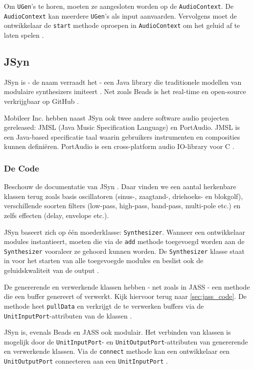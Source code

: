 Om \verb+UGen+'s te horen, moeten ze aangesloten worden op de \verb+AudioContext+. De \verb+AudioContext+ kan meerdere \verb+UGen+'s als input aanvaarden. Vervolgens moet de ontwikkelaar de \verb+start+ methode oproepen in \verb+AudioContext+ om het geluid af te laten spelen \autocite{beadsdocs}.

\subsection{JSyn}

JSyn is - de naam verraadt het - een Java library die traditionele modellen van modulaire synthesizers imiteert \autocite{jsyn}. Net zoals Beads is het real-time en open-source verkrijgbaar op GitHub \autocite{jsyngit}.

Mobileer Inc. hebben naast JSyn ook twee andere software audio projecten gereleased: JMSL (Java Music Specification Language) en PortAudio. JMSL is een Java-based specificatie taal waarin gebruikers instrumenten en composities kunnen definiëren. PortAudio is een cross-platform audio IO-library voor C \autocite{jsyn}.

\subsubsection*{De Code}

Beschouw de documentatie van JSyn \autocite{jsyndocs}. Daar vinden we een aantal herkenbare klassen terug zoals basis oscillatoren (sinus-, zaagtand-, driehoeks- en blokgolf), verschillende soorten filters (low-pass, high-pass, band-pass, multi-pole etc.) en zelfs effecten (delay, envelope etc.).

JSyn baseert zich op één moederklasse: \verb+Synthesizer+. Wanneer een ontwikkelaar modules instantieert, moeten die via de \verb+add+ methode toegevoegd worden aan de \verb+Synthesizer+ vooraleer ze gehoord kunnen worden. De \verb+Synthesizer+ klasse staat in voor het starten van alle toegevoegde modules en beslist ook de geluidskwaliteit van de output \autocite{jsyndocs}.

De genererende en verwerkende klassen hebben - net zoals in JASS - een methode die een buffer genereert of verwerkt. Kijk hiervoor terug naar \ref{sec:jass_code}. De methode heet \verb+pullData+ en verkrijgt de te verwerken buffers via de \verb+UnitInputPort+-attributen van de klassen \autocite{jsyndocs}.

JSyn is, evenals Beads en JASS ook modulair. Het verbinden van klassen is mogelijk door de \verb+UnitInputPort+- en \verb+UnitOutputPort+-attributen van genererende en verwerkende klassen. Via de \verb+connect+ methode kan een ontwikkelaar een \verb+UnitOutputPort+ connecteren aan een \verb+UnitInputPort+ \autocite{jsyndocs}.

